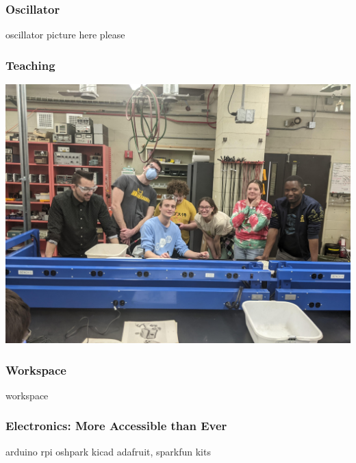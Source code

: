 \documentclass{presentation}
\begin{document}
\begin{frame}\frametitle{Oscillator}
  oscillator picture here please
\end{frame}

\begin{frame}\frametitle{Teaching}
  \includegraphics[width=\textwidth]{"./PXL_20230203_192355031.jpg"}
\end{frame}

\begin{frame}\frametitle{Workspace}
  workspace
\end{frame}

\begin{frame}\frametitle{Electronics: More Accessible than Ever}
  arduino
  rpi
  oshpark
  kicad
  adafruit, sparkfun
  kits
\end{frame}
\end{document}
